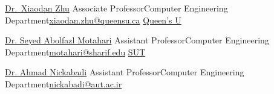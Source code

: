 
\newcommand{\refskip}{\enskip\cdotp\enskip}
\newcommand{\cesuffix}{{\refskip}Computer Engineering Department}

\begin{cvhonors}

  \cvref
    {\href{https://scholar.google.ca/citations?user=a6MYnuUAAAAJ&hl=en}{Dr.~Xiaodan Zhu}} %
    {Associate Professor\cesuffix\refskip\href{mailto:xiaodan.zhu@queensu.ca}{xiaodan.zhu@queensu.ca}} %
    {\href{https://www.queensu.ca/}{Queen's U}} %

  \cvref
    {\href{https://scholar.google.com/citations?user=rJ-biB0AAAAJ&hl=en}{Dr. Seyed Abolfazl Motahari}} %
    {Assistant Professor\cesuffix\refskip\href{mailto:motahari@sharif.edu}{motahari@sharif.edu}} %
    {\href{https://www.sharif.edu}{SUT}} %

  \cvref
    {\href{https://scholar.google.com/citations?user=pSMNSZwAAAAJ&hl=en}{Dr. Ahmad Nickabadi}} %
    {Assistant Professor\cesuffix\refskip\href{mailto:nickabadi@aut.ac.ir}{nickabadi@aut.ac.ir}} %
    {} %




\end{cvhonors}

